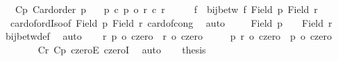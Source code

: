 \begin{isabellebody}
\ \ \ Cp{\isacharcolon}{\kern0pt}\ {\isachardoublequoteopen}Card{\isacharunderscore}{\kern0pt}order\ p{}{\isachardoublequoteclose}\isanewline
\ \ \ {\isachardoublequoteopen}p{}\ {\isacharcircum}{\kern0pt}c\ p{}\ {\isacharequal}{\kern0pt}o\ r{}\ {\isacharcircum}{\kern0pt}c\ r{}{\isachardoublequoteclose}\isanewline
%
\isadelimproof
%
\endisadelimproof
%
\isatagproof
{}\isamarkupfalse%
\ {\isacharminus}{\kern0pt}\isanewline
\ \ \isamarkupfalse%
\ f\ \ {\isachardoublequoteopen}bij{\isacharunderscore}{\kern0pt}betw\ f\ {\isacharparenleft}{\kern0pt}Field\ p{}{\isacharparenright}{\kern0pt}\ {\isacharparenleft}{\kern0pt}Field\ r{}{\isacharparenright}{\kern0pt}{\isachardoublequoteclose}\isanewline
\ \ \ \ \isamarkupfalse%
\ {}\ card{\isacharunderscore}{\kern0pt}of{\isacharunderscore}{\kern0pt}ordIso{\isacharbrackleft}{\kern0pt}of\ {\isachardoublequoteopen}Field\ p{}{\isachardoublequoteclose}\ {\isachardoublequoteopen}Field\ r{}{\isachardoublequoteclose}{\isacharbrackright}{\kern0pt}\ card{\isacharunderscore}{\kern0pt}of{\isacharunderscore}{\kern0pt}cong\ \isamarkupfalse%
\ auto\isanewline
\ \ \isamarkupfalse%
\ {}{\isacharcolon}{\kern0pt}\ {\isachardoublequoteopen}Field\ p{}\ {\isacharequal}{\kern0pt}\ {\isacharbraceleft}{\kern0pt}{\isacharbraceright}{\kern0pt}\ {\isasymlongleftrightarrow}\ Field\ r{}\ {\isacharequal}{\kern0pt}\ {\isacharbraceleft}{\kern0pt}{\isacharbraceright}{\kern0pt}{\isachardoublequoteclose}\ \isamarkupfalse%
\ bij{\isacharunderscore}{\kern0pt}betw{\isacharunderscore}{\kern0pt}def\ \isamarkupfalse%
\ auto\isanewline
\ \ \isamarkupfalse%
\ r{\isacharcolon}{\kern0pt}\ {\isachardoublequoteopen}p{}\ {\isacharequal}{\kern0pt}o\ czero\ {\isasymLongrightarrow}\ r{}\ {\isacharequal}{\kern0pt}o\ czero{\isachardoublequoteclose}\isanewline
\ \ \ \ \ p{\isacharcolon}{\kern0pt}\ {\isachardoublequoteopen}r{}\ {\isacharequal}{\kern0pt}o\ czero\ {\isasymLongrightarrow}\ p{}\ {\isacharequal}{\kern0pt}o\ czero{\isachardoublequoteclose}\isanewline
\ \ \ \ \ \isamarkupfalse%
\ {}\ Cr\ Cp\ czeroE\ czeroI\ \isamarkupfalse%
\ auto\isanewline
\ \ \isamarkupfalse%
\ {\isacharquery}{\kern0pt}thesis\ \isamarkupfalse%

\end{isabellebody}
